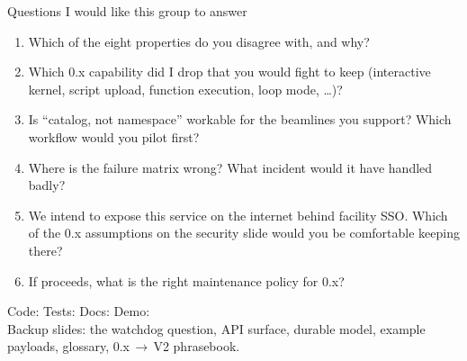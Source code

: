 \begin{frame}{Questions I would like this group to answer}
    \normalsize
    \begin{enumerate}
        \setlength{\itemsep}{0.25cm}
        \item Which of the eight properties do you disagree with, and why?
        \item Which 0.x capability did I drop that you would fight to keep
              (interactive kernel, script upload, function execution, loop mode, \ldots)?
        \item Is ``catalog, not namespace'' workable for the beamlines you support?
              Which workflow would you pilot first?
        \item Where is the failure matrix wrong? What incident would it have handled badly?
        \item We intend to expose this service on the internet behind facility SSO.
              Which of the 0.x assumptions on the security slide would you be comfortable keeping there?
        \item If \vtwo{} proceeds, what is the right maintenance policy for 0.x?
    \end{enumerate}
    \vspace{0.4cm}
    \begin{center}
        {\normalsize\color{qsgray} Code:  \quad
        Tests:  \quad
        Docs:  \quad
        Demo: \\[0.2cm]
        \footnotesize Backup slides: the watchdog question, API surface, durable model, example payloads, glossary, 0.x\,$\rightarrow$\,V2 phrasebook.}
    \end{center}
\end{frame}
